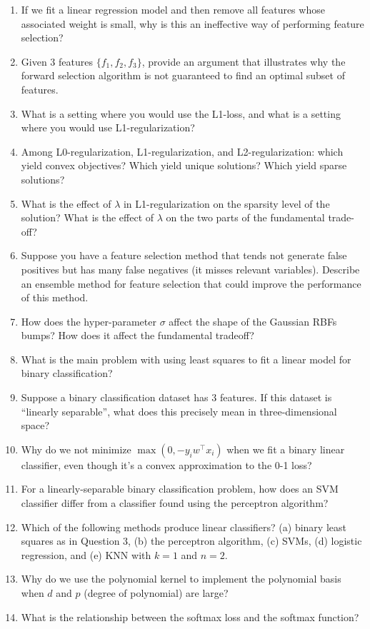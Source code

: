 \documentclass{article}
\def\enum#1{\begin{enumerate}#1\end{enumerate}}
\begin{document}
\enum{
\item If we fit a linear regression model and then remove all features whose associated weight is small, why is this an ineffective way of performing feature selection?
\item Given $3$ features $\{f_1, f_2, f_3\}$, provide an argument that illustrates why the forward selection algorithm is not guaranteed to find an optimal subset of features.
\item What is a setting where you would use the L1-loss, and what is a setting where you would use L1-regularization?
\item Among L0-regularization, L1-regularization, and L2-regularization: which yield convex objectives? Which yield unique solutions? Which yield sparse solutions?
\item What is the effect of $\lambda$ in L1-regularization on the sparsity level of the solution? What is the effect of $\lambda$ on the two parts of the fundamental trade-off?
\item Suppose you have a feature selection method that tends not generate false positives but has many false negatives (it misses relevant variables). Describe an ensemble method for feature selection that could improve the performance of this method.
\item How does the hyper-parameter $\sigma$ affect the shape of the Gaussian RBFs bumps? How does it affect the fundamental tradeoff?
\item What is the main problem with using least squares to fit a linear model for binary classification?
\item Suppose a binary classification dataset has 3 features. If this dataset is ``linearly separable'', what does this precisely mean in three-dimensional space?
\item Why do we not minimize $\max(0, -y_i w^\top x_i)$ when we fit a binary linear classifier, even though it’s a convex approximation to the 0-1 loss?
\item For a linearly-separable binary classification problem, how does an SVM classifier differ from a classifier found using the perceptron algorithm?
\item Which of the following methods produce linear classifiers? (a) binary least squares as in Question 3, (b) the perceptron algorithm, (c) SVMs, (d) logistic regression, and (e) KNN with $k=1$ and $n=2$.
\item Why do we use the polynomial kernel to implement the polynomial basis when $d$ and $p$ (degree of polynomial) are large?
\item What is the relationship between the softmax loss and the softmax function?
}
\end{document}
